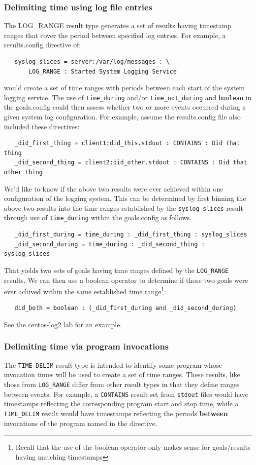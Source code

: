 \documentclass[12pt]{article}
\begin{document}
\subsubsection{Delimiting time using log file entries}
\label{log_range}
The LOG\_RANGE result type generates a set of results having timestamp ranges that
cover the period between specified log entries. For example, a results.config directive of:
\begin{verbatim}  
   syslog_slices = server:/var/log/messages : \
       LOG_RANGE : Started System Logging Service
\end{verbatim}
\noindent would create a set of time ranges with periods between each start of
the system logging service.  The use of {\tt time\_during}
and/or {\tt time\_not\_during} and {\tt boolean} in the goals.config could then assess whether
two or more events occurred during a given system log configuration.  For example, assume the
results.config file also included these directives:  
\begin{verbatim}  
   _did_first_thing = client1:did_this.stdout : CONTAINS : Did that thing
   _did_second_thing = client2:did_other.stdout : CONTAINS : Did that other thing
\end{verbatim}
\noindent We'd like to know if the above two results were ever achieved within one configuration
of the logging system.  This can be determined by first binning the above two results into the 
time ranges established by the {\tt syslog\_slices} result through use of {\tt time\_during} within
the goals.config as follows.
\begin{verbatim}  
   _did_first_during = time_during : _did_first_thing : syslog_slices
   _did_second_during = time_during : _did_second_thing : syslog_slices
\end{verbatim}
\noindent That yields two sets of goals having time ranges defined by the {\tt LOG\_RANGE}
results.  We can then use a boolean operator to determine if those two goals were ever
achived within the same established time range\footnote{Recall that the use of the boolean operator
only makes sense for goals/results having matching timestamps}:
\begin{verbatim}  
   did_both = boolean : (_did_first_during and _did_second_during)
\end{verbatim}

See the centos-log2 lab for an example. 

\subsubsection{Delimiting time via program invocations}
\label{time_delim}
The {\tt TIME\_DELIM} result type is intended to identify some
program whose invocation times will be used to create a set of time ranges.
These results, like those from {\tt LOG\_RANGE} differ from other result types
in that they define ranges between events.  For example, a {\tt CONTAINS} result
set from {\tt stdout} files would have timestamps reflecting the corresponding program
start and stop time, while a {\tt TIME\_DELIM} result would have timestamps
reflecting the periods \textbf{between} invocations of the program named in the directive.
\end{document}
